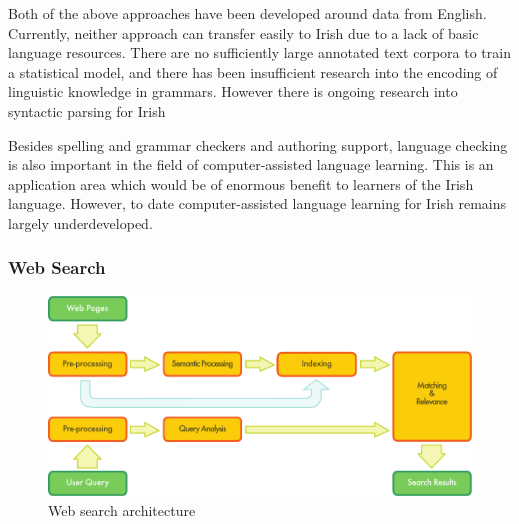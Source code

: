 \begin{multicols}{2}

Both of the above approaches have been developed around data from English. Currently, neither approach can transfer easily to Irish due to a lack of basic language resources. There are no sufficiently large annotated text corpora to train a statistical model, and there has been insufficient research into the encoding of linguistic knowledge in grammars. However there is ongoing research into syntactic parsing for Irish \cite{lynn2012,elaine2010}


Besides spelling and grammar checkers and authoring support, language checking is also important in the field of computer-assisted language learning. This is an application area which would be of enormous benefit to learners of the Irish language. However, to date computer-assisted language learning for Irish remains largely underdeveloped.

\subsubsection{Web Search}

\begin{figure}[htb]
  \center
  \includegraphics[width=\textwidth]{../_media/english/web_search_architecture}
  \caption{Web search architecture}
\label{fig:websearcharch_en}
 \end{figure}


\end{multicols}

